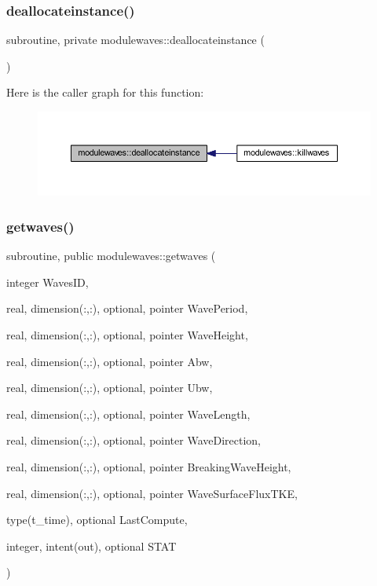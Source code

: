 \subsubsection{\texorpdfstring{deallocateinstance()}{deallocateinstance()}}
{\footnotesize\ttfamily subroutine, private modulewaves\+::deallocateinstance (\begin{DoxyParamCaption}{ }\end{DoxyParamCaption})\hspace{0.3cm}{\ttfamily [private]}}

Here is the caller graph for this function\+:\nopagebreak
\begin{figure}[H]
\begin{center}
\leavevmode
\includegraphics[width=350pt]{namespacemodulewaves_ae0f81c5ccbee665024d621b4578f59ed_icgraph}
\end{center}
\end{figure}
\mbox{\label{namespacemodulewaves_a12875a6c82df32faa0d9a05dd2d67b1e}} 
\subsubsection{\texorpdfstring{getwaves()}{getwaves()}}
{\footnotesize\ttfamily subroutine, public modulewaves\+::getwaves (\begin{DoxyParamCaption}\item[{integer}]{Waves\+ID,  }\item[{real, dimension(\+:,\+:), optional, pointer}]{Wave\+Period,  }\item[{real, dimension(\+:,\+:), optional, pointer}]{Wave\+Height,  }\item[{real, dimension(\+:,\+:), optional, pointer}]{Abw,  }\item[{real, dimension(\+:,\+:), optional, pointer}]{Ubw,  }\item[{real, dimension(\+:,\+:), optional, pointer}]{Wave\+Length,  }\item[{real, dimension(\+:,\+:), optional, pointer}]{Wave\+Direction,  }\item[{real, dimension(\+:,\+:), optional, pointer}]{Breaking\+Wave\+Height,  }\item[{real, dimension(\+:,\+:), optional, pointer}]{Wave\+Surface\+Flux\+T\+KE,  }\item[{type(t\+\_\+time), optional}]{Last\+Compute,  }\item[{integer, intent(out), optional}]{S\+T\+AT }\end{DoxyParamCaption})}

